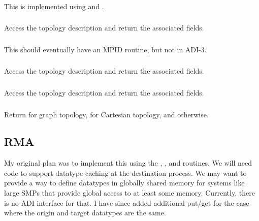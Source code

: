 \documentclass{article}
\begin{document}
\subsubsection{}
This is implemented using  and
. 

\subsubsection{}
Access the topology description and return the associated fields.

\subsubsection{}
This should eventually have an MPID routine, but not in ADI-3.

\subsubsection{}
Access the topology description and return the associated fields.

\subsubsection{}
Access the topology description and return the associated fields.

\subsubsection{}
Return  for graph topology,  for
Cartesian topology, and  otherwise.

\subsection{RMA}

My original plan was to implement this using the ,
,  and  routines.  We
will need code to support datatype caching at the destination process.
We may want to provide a way to define datatypes in globally shared
memory for systems like large SMPs that provide global access to at
least some memory.  Currently, there is no ADI interface for that.
I have since added additional put/get for the case where the origin
and target datatypes are the same.  
\end{document}

